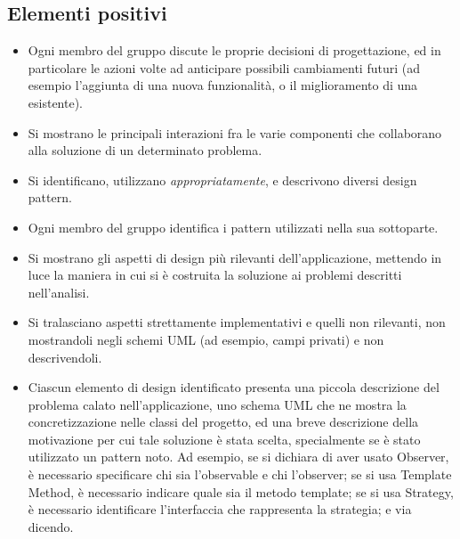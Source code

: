 \documentclass[a4paper,12pt]{report}
\begin{document}
\subsection*{Elementi positivi}

\begin{itemize}
	\item Ogni membro del gruppo discute le proprie decisioni di progettazione, ed in particolare le azioni volte ad anticipare possibili cambiamenti futuri (ad esempio l'aggiunta di una nuova funzionalità, o il miglioramento di una esistente).
	\item Si mostrano le principali interazioni fra le varie componenti che collaborano alla soluzione di un determinato problema.
	\item Si identificano, utilizzano \textit{appropriatamente}, e descrivono diversi design pattern.
	\item Ogni membro del gruppo identifica i pattern utilizzati nella sua sottoparte.
	\item Si mostrano gli aspetti di design più rilevanti dell'applicazione, mettendo in luce la maniera in cui si è costruita la soluzione ai problemi descritti nell'analisi.
	\item Si tralasciano aspetti strettamente implementativi e quelli non rilevanti, non mostrandoli negli schemi UML (ad esempio, campi privati) e non descrivendoli.
	\item Ciascun elemento di design identificato presenta una piccola descrizione del problema calato
nell'applicazione, uno schema UML che ne mostra la concretizzazione nelle classi del progetto, ed
una breve descrizione della motivazione per cui tale soluzione è stata scelta, specialmente se è stato utilizzato un pattern noto. Ad esempio, se si
dichiara di aver usato Observer, è necessario specificare chi sia l'observable e chi l'observer; se
si usa Template Method, è necessario indicare quale sia il metodo template; se si usa Strategy, è
necessario identificare l'interfaccia che rappresenta la strategia; e via dicendo.
\end{itemize}
\end{document}
